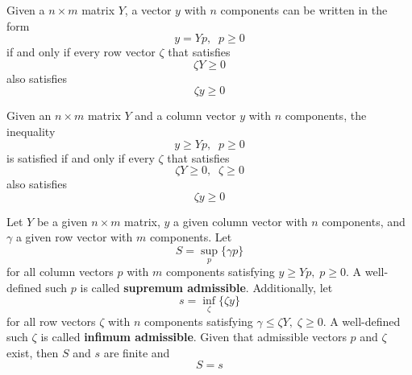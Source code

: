   \begin{corollary}
    Given a $n \times m$ matrix $Y$, a vector $y$ with $n$ components can be written in the form 
    \begin{equation}
      y = Y p, \;\; p \geq 0
    \end{equation}
    if and only if every row vector $\zeta$ that satisfies 
    \begin{equation}
      \zeta Y \geq 0
    \end{equation}
    also satisfies 
    \begin{equation}
      \zeta y \geq 0
    \end{equation}
  \end{corollary}

  \begin{theorem}
    Given an $n \times m$ matrix $Y$ and a column vector $y$ with $n$ components, the inequality 
    \begin{equation}
      y \geq Y p, \;\; p \geq 0
    \end{equation}
    is satisfied if and only if every $\zeta$ that satisfies
    \begin{equation}
      \zeta Y \geq 0, \;\; \zeta \geq 0
    \end{equation}
    also satisfies 
    \begin{equation}
      \zeta y \geq 0
    \end{equation}
  \end{theorem}

  \begin{theorem}
    Let $Y$ be a given $n \times m$ matrix, $y$ a given column vector with $n$ components, and $\gamma$ a given row vector with $m$ components. Let 
    \begin{equation}
      S = \sup_p \{\gamma p\}
    \end{equation}
    for all column vectors $p$ with $m$ components satisfying $y \geq Y p, \; p \geq 0$. A well-defined such $p$ is called \textbf{supremum admissible}. Additionally, let 
    \begin{equation}
      s = \inf_\zeta \{ \zeta y\}
    \end{equation}
    for all row vectors $\zeta$ with $n$ components satisfying $\gamma \leq \zeta Y, \; \zeta \geq 0$. A well-defined such $\zeta$ is called \textbf{infimum admissible}. Given that admissible vectors $p$ and $\zeta$ exist, then $S$ and $s$ are finite and 
    \begin{equation}
      S = s
    \end{equation}
  \end{theorem}


